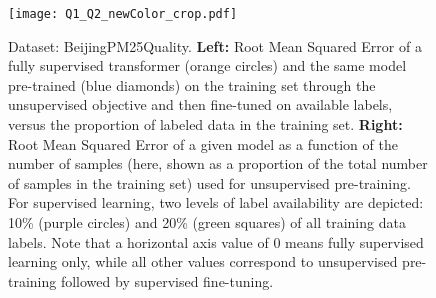 \documentclass{article} \usepackage{iclr2021_conference,times}
\begin{document}
\begin{figure}[h]
    \centering
    \texttt{[image: Q1\_Q2\_newColor\_crop.pdf]}
    \caption{Dataset: BeijingPM25Quality. \textbf{Left:} Root Mean Squared Error of a fully supervised transformer (orange circles) and the same model pre-trained (blue diamonds) on the training set through the unsupervised objective and then fine-tuned on available labels, versus the proportion of labeled data in the training set. \textbf{Right:} Root Mean Squared Error of a given model as a function of the number of samples (here, shown as a proportion of the total number of samples in the training set) used for unsupervised pre-training. For supervised learning, two levels of label availability are depicted: 10\% (purple circles) and 20\% (green squares) of all training data labels. Note that a horizontal axis value of 0 means fully supervised learning only, while all other values correspond to unsupervised pre-training followed by supervised fine-tuning.}
    \label{fig:Q1_Q2}
\end{figure}
\end{document}
